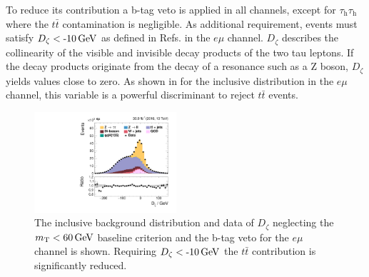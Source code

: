 To reduce its contribution a b-tag veto is applied in 
all channels, except for $\tau_\text{h}\tau_\text{h}$ where the $t\bar{t}$ contamination is negligible. As additional requirement, events must satisfy $D_{\zeta} < \text{-10\,{GeV}}$  as defined in Refs. \cite{Sirunyan:2017khh,nehrkorn} in the $e\mu$ channel.
$D_\zeta$ describes the collinearity of the visible and invisible decay products 
of the two tau leptons. If the decay products originate from the decay of a resonance such as a Z boson, $D_\zeta$ yields values close to zero. As shown in  for the inclusive distribution in the $e\mu$ channel, this variable is a powerful discriminant to reject $t\bar{t}$ events.
\begin{figure}[h!]
    \centering
    \includegraphics[width=0.47\textwidth]{Figures/eventselection/Categorization/em/pZetaMissVis.pdf}
    \caption[$D_{\zeta}$ inclusive distribution in the $e\mu$ channel.]{The inclusive background distribution and data of $D_{\zeta}$ neglecting the $m_\text{T}<\text{60\,{GeV}}$ baseline criterion and the b-tag veto for the $e\mu$ channel is shown. Requiring $D_{\zeta} < \text{-10\,{GeV}}$ the $t\bar{t}$ contribution is significantly reduced.}\label{dzeta}
\end{figure}%

